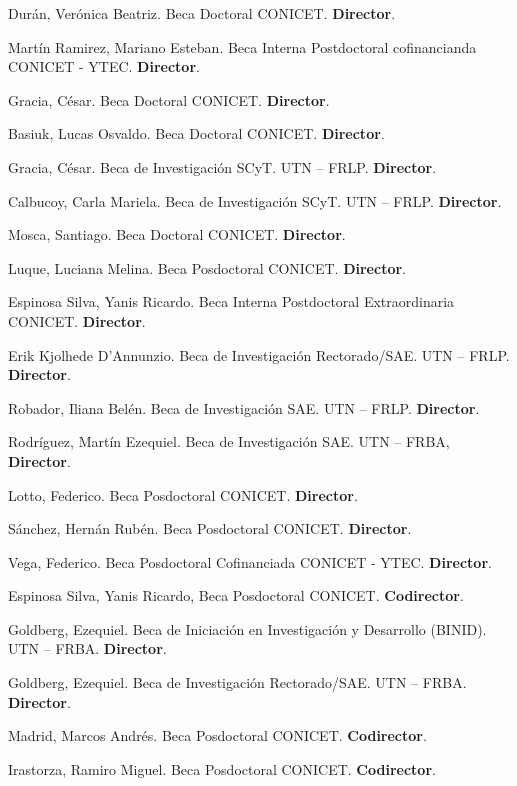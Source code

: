 \begin{timeline}
 Durán, Verónica Beatriz. Beca Doctoral CONICET. \textbf{Director}.

 Martín Ramirez, Mariano Esteban. Beca Interna Postdoctoral cofinancianda CONICET - YTEC. \textbf{Director}.

 Gracia, César. Beca Doctoral CONICET. \textbf{Director}.

 Basiuk, Lucas Osvaldo. Beca Doctoral CONICET. \textbf{Director}.

 Gracia, César. Beca de Investigación SCyT. UTN -- FRLP. \textbf{Director}.

 Calbucoy, Carla Mariela. Beca de Investigación SCyT. UTN -- FRLP. \textbf{Director}.

 Mosca, Santiago. Beca Doctoral CONICET. \textbf{Director}.

 Luque, Luciana Melina. Beca Posdoctoral CONICET. \textbf{Director}.

 Espinosa Silva, Yanis Ricardo. Beca Interna Postdoctoral Extraordinaria CONICET. \textbf{Director}.

 Erik Kjolhede D'Annunzio. Beca de Investigación Rectorado/SAE. UTN -- FRLP. \textbf{Director}.

 Robador, Iliana Belén. Beca de Investigación SAE. UTN -- FRLP. \textbf{Director}.

 Rodríguez, Martín Ezequiel. Beca de Investigación SAE. UTN -- FRBA, \textbf{Director}.

 Lotto, Federico. Beca Posdoctoral CONICET. \textbf{Director}.

 Sánchez, Hernán Rubén. Beca Posdoctoral CONICET. \textbf{Director}.

 Vega, Federico. Beca Posdoctoral Cofinanciada CONICET - YTEC. \textbf{Director}.

 Espinosa Silva, Yanis Ricardo, Beca Posdoctoral CONICET. \textbf{Codirector}.

 Goldberg, Ezequiel. Beca de Iniciación en Investigación y Desarrollo (BINID). UTN -- FRBA. \textbf{Director}.

 Goldberg, Ezequiel. Beca de Investigación Rectorado/SAE. UTN -- FRBA. \textbf{Director}.

 Madrid, Marcos Andrés. Beca Posdoctoral CONICET. \textbf{Codirector}.

 Irastorza, Ramiro Miguel. Beca Posdoctoral CONICET. \textbf{Codirector}.
\end{timeline}

